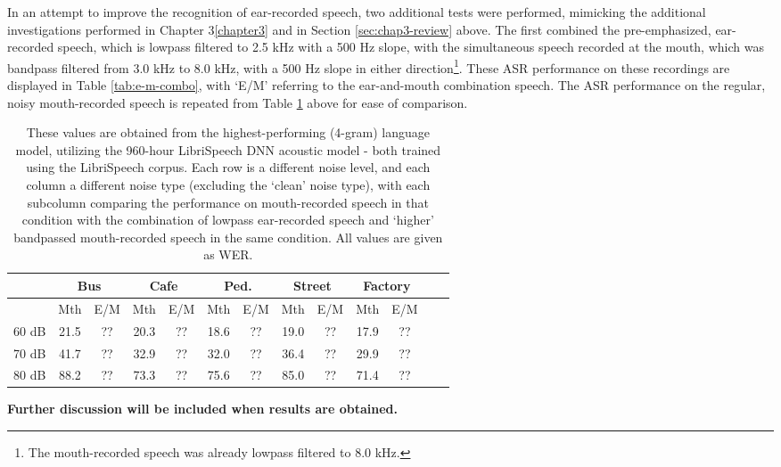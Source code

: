 In an attempt to improve the recognition of ear-recorded speech, two additional tests were performed, mimicking the additional investigations performed in Chapter 3\ref{chapter3} and in Section \ref{sec:chap3-review} above.  The first combined the pre-emphasized, ear-recorded speech, which is lowpass filtered to 2.5 kHz with a 500 Hz slope, with the simultaneous speech recorded at the mouth, which was bandpass filtered from 3.0 kHz to 8.0 kHz, with a 500 Hz slope in either direction\footnote{The mouth-recorded speech was already lowpass filtered to 8.0 kHz.}.  These ASR performance on these recordings are displayed in Table \ref{tab:e-m-combo}, with `E/M' referring to the ear-and-mouth combination speech.  The ASR performance on the regular, noisy mouth-recorded speech is repeated from Table \ref{tab:disc-all-wers} above for ease of comparison.

\begin{table}[h]
\begin{center}
\begin{tabular}{| c || c | c | c | c | c | c | c | c | c | c | c | c |} \hline
      & \multicolumn{2}{|c|}{Bus} & \multicolumn{2}{|c|}{Cafe} & \multicolumn{2}{|c|}{Ped.} & \multicolumn{2}{|c|}{Street} & \multicolumn{2}{|c|}{Factory} \\ \hline
      & Mth & E/M & Mth & E/M & Mth & E/M & Mth & E/M & Mth & E/M \\ \hline\hline
60 dB & 21.5 & ?? & 20.3 & ?? & 18.6 & ?? & 19.0 & ?? & 17.9 & ??  \\ \hline
70 dB & 41.7 & ?? & 32.9 & ?? & 32.0 & ?? & 36.4 & ?? & 29.9 & ??  \\ \hline
80 dB & 88.2 & ?? & 73.3 & ?? & 75.6 & ?? & 85.0 & ?? & 71.4 & ??  \\ \hline
\end{tabular}
\end{center}
\caption{These values are obtained from the highest-performing (4-gram) language model, utilizing the 960-hour LibriSpeech DNN acoustic model - both trained using the LibriSpeech corpus.  Each row is a different noise level, and each column a different noise type (excluding the `clean' noise type), with each subcolumn comparing the performance on mouth-recorded speech in that condition with the combination of lowpass ear-recorded speech and `higher' bandpassed mouth-recorded speech in the same condition.  All values are given as WER.}\label{tab:disc-all-wers}
\end{table}

\textbf{Further discussion will be included when results are obtained.}

